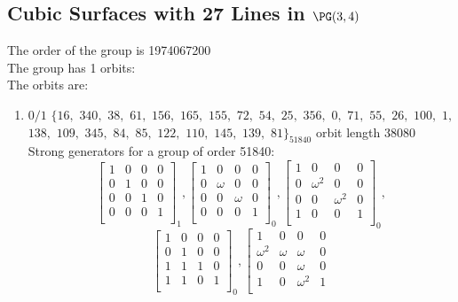 \subsection*{Cubic Surfaces with 27 Lines in $\PG(3,4)$}
The order of the group is 1974067200\\
\bigskip
The group has 1 orbits: \\
The orbits are:
\begin{enumerate}[(1)]
\item
$0 / 1$ 
$
\{ 16,$ $340,$ $38,$ $61,$ $156,$ $165,$ $155,$ $72,$ $54,$ $25,$ $356,$ $0,$ $71,$ $55,$ $26,$ $100,$ $1,$ $138,$ $109,$ $345,$ $84,$ $85,$ $122,$ $110,$ $145,$ $139,$ $81 \}_{51840}$ orbit length $38080$\\
Strong generators for a group of order 51840:
$$
\left[
\begin{array}{*{4}{r}}
1 & 0 & 0 & 0\\
0 & 1 & 0 & 0\\
0 & 0 & 1 & 0\\
0 & 0 & 0 & 1\\
\end{array}
\right]
_{1}
, 
\left[
\begin{array}{*{4}{r}}
1 & 0 & 0 & 0\\
0 & \omega  & 0 & 0\\
0 & 0 & \omega  & 0\\
0 & 0 & 0 & 1\\
\end{array}
\right]
_{0}
, 
\left[
\begin{array}{*{4}{r}}
1 & 0 & 0 & 0\\
0 & \omega^{2} & 0 & 0\\
0 & 0 & \omega^{2} & 0\\
1 & 0 & 0 & 1\\
\end{array}
\right]
_{0}
, 
$$
$$
\left[
\begin{array}{*{4}{r}}
1 & 0 & 0 & 0\\
0 & 1 & 0 & 0\\
1 & 1 & 1 & 0\\
1 & 1 & 0 & 1\\
\end{array}
\right]
_{0}
, 
\left[
\begin{array}{*{4}{r}}
1 & 0 & 0 & 0\\
\omega^{2} & \omega  & \omega  & 0\\
0 & 0 & \omega  & 0\\
1 & 0 & \omega^{2} & 1\\

\end{array}$$
\end{enumerate}
